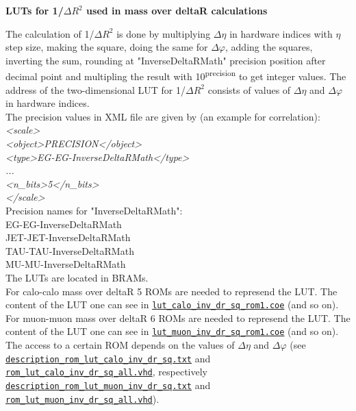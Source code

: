 \textbf{LUTs for 1/$\Delta$$R^2$ used in mass over deltaR calculations}
\label{sec:gtl:calc_luts_inverse_deltaR}

The calculation of 1/$\Delta$$R^2$ is done by multiplying $\Delta\eta$ in hardware indices with $\eta$ step size, making the square, doing the same for $\Delta\varphi$,
adding the squares, inverting the sum, rounding at "InverseDeltaRMath" precision position after decimal point and multipling the result with 10\textsuperscript{\tiny{precision}} to get integer values.
The address of the two-dimensional LUT for 1/$\Delta$$R^2$ consists of values of $\Delta\eta$ and $\Delta\varphi$ in hardware indices.\\

The precision values in XML file are given by (an example for \egamma \egamma correlation):\\
\textit{<scale>\\
    <object>PRECISION</object>\\
    <type>EG-EG-InverseDeltaRMath</type>\\
    ...\\
    <n\_bits>5</n\_bits>\\
</scale>}\\

Precision names for "InverseDeltaRMath":\\
EG-EG-InverseDeltaRMath\\
JET-JET-InverseDeltaRMath\\
TAU-TAU-InverseDeltaRMath\\
MU-MU-InverseDeltaRMath\\

The LUTs are located in BRAMs.\\
For calo-calo mass over deltaR 5 ROMs are needed to represend the LUT. The content of the LUT one can see in \href{\gitbranch/firmware/hdl/ngc/blk_mem_gen_v8_4_4/lut_calo_inv_dr_sq_rom1.coe}{\texttt{\textquotesingle lut\_calo\_inv\_dr\_sq\_rom1.coe\textquotesingle }} (and so on).\\
For muon-muon mass over deltaR 6 ROMs are needed to represend the LUT. The content of the LUT one can see in \href{\gitbranch/firmware/hdl/ngc/blk_mem_gen_v8_4_4/lut_muon_inv_dr_sq_rom1.coe}{\texttt{\textquotesingle lut\_muon\_inv\_dr\_sq\_rom1.coe\textquotesingle }} (and so on).\\
The access to a certain ROM depends on the values of $\Delta\eta$ and $\Delta\varphi$ (see \href{\gitbranch/test_rom_lut_calo_inv_dr_sq_all/doc/description_rom_lut_calo_inv_dr_sq.txt}{\texttt{\textquotesingle description\_rom\_lut\_calo\_inv\_dr\_sq.txt\textquotesingle }} and \href{\gitbranch/firmware/hdl/payload/gtl/common/rom_lut_calo_inv_dr_sq_all.vhd}{\texttt{\textquotesingle rom\_lut\_calo\_inv\_dr\_sq\_all.vhd\textquotesingle }}, respectively\\
\href{\gitbranch/test_rom_lut_muon_inv_dr_sq_all/doc/description_rom_lut_muon_inv_dr_sq.txt}{\texttt{\textquotesingle description\_rom\_lut\_muon\_inv\_dr\_sq.txt\textquotesingle }} and\\
\href{\gitbranch/firmware/hdl/payload/gtl/common/rom_lut_muon_inv_dr_sq_all.vhd}{\texttt{\textquotesingle rom\_lut\_muon\_inv\_dr\_sq\_all.vhd\textquotesingle }}).\\


